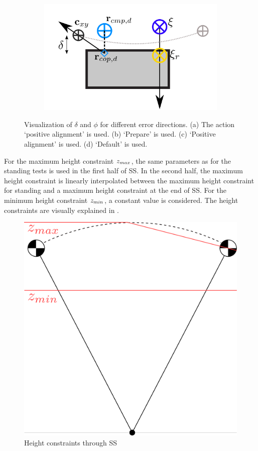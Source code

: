 \begin{figure}[h]
\begin{subfigure}{0.49\textwidth}
    \caption{}
     \label{fig:phiVize}
  \end{subfigure}
  \begin{subfigure}{0.49\textwidth}
    \centering
  \includegraphics[width=.7\linewidth]{STYLESTUFF/ICPplanStartSSPhiVizRightError.png}
    \caption{}
     \label{fig:phi}
  \end{subfigure}
  \caption{Visualization of $\delta$ and $\phi$ for different error directions. (a) The action `positive alignment' is used. (b) `Prepare' is used. (c) `Positive alignment' is used. (d) `Default' is used.}
  \label{fig:phi}
\end{figure}

For the maximum height constraint $z_{max}$, the same parameters as for the standing tests is used in the first half of \ac{SS}. In the second half, the maximum height constraint is linearly interpolated between the maximum height constraint for standing and a maximum height constraint at the end of \ac{SS}.  For the minimum height constraint $z_{min}$, a constant value is considered. The height constraints are visually explained in .
\begin{figure}
\centering
  \includegraphics[width=.4\linewidth]{STYLESTUFF/heightconstraints.png}
   \caption{Height constraints through \acf{SS}}
    \label{fig:heightconstraints}
\end{figure} 
